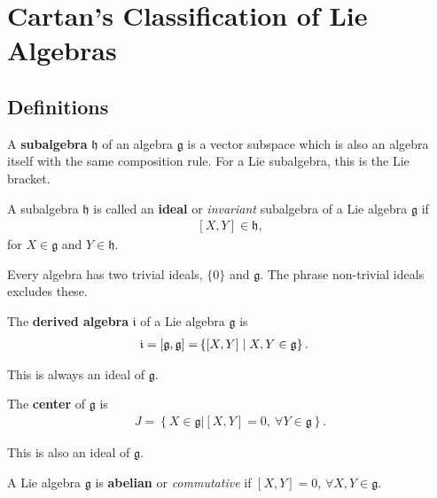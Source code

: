 \section{Cartan's Classification of Lie Algebras}

\subsection{Definitions}

\begin{definition}
    A \textbf{subalgebra} $\mathfrak{h}$ of an algebra $\mathfrak{g}$ is a vector subspace which is also an algebra itself with the same composition rule. For a Lie subalgebra, this is the Lie bracket.
\end{definition}

\begin{definition}
    A subalgebra $\mathfrak{h}$ is called an \textbf{ideal} or \textit{invariant} subalgebra of a Lie algebra $\mathfrak{g}$ if
    \begin{align}
        \left[ X,Y  \right] \in \mathfrak{h}
    ,\end{align}
    for $X \in \mathfrak{g}$ and $Y \in \mathfrak{h} $.
\end{definition}

Every algebra has two trivial ideals, $\{0\} $ and $\mathfrak{g}$. The phrase non-trivial ideals excludes these.

\begin{definition}
    The \textbf{derived algebra} $\mathfrak{i}$ of a Lie algebra $\mathfrak{g}$ is
    \begin{align}
        \mathfrak{i} = \left[ \mathfrak{g}, \mathfrak{g} \right]  = \span \left\{ \left[ X, Y \right]  \mid  X,Y \in \mathfrak{g} \right\}
    .\end{align}
\end{definition}

This is always an ideal of $\mathfrak{g}$.

\begin{definition}
    The \textbf{center} of $\mathfrak{g}$ is
    \begin{align}
        J = \left\{ X \in \mathfrak{g} | \left[ X, Y \right] = 0,~ \forall Y \in \mathfrak{g} \right\} 
    .\end{align}
\end{definition}

This is also an ideal of $\mathfrak{g}$.


\begin{definition}
    A Lie algebra $\mathfrak{g}$ is \textbf{abelian} or \textit{commutative} if $\left[ X, Y \right] = 0$, $\forall X,Y \in \mathfrak{g}$.
\end{definition}

